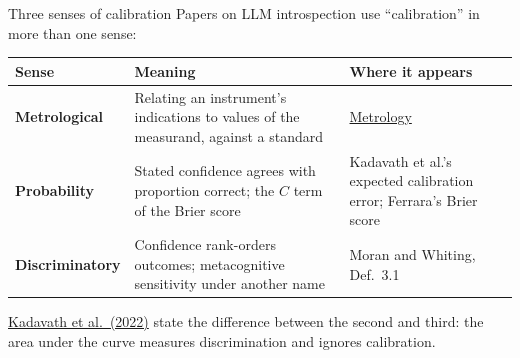 \documentclass[aspectratio=169,11pt]{beamer}
\newcommand{\site}{https://measuring-self-reports.github.io/measuring-self-reports}
\begin{document}
\begin{frame}[label=calsenses]{Three senses of calibration}
Papers on LLM introspection use ``calibration'' in more than one sense:

\vspace{0.2em}
\begin{center}
{\footnotesize\renewcommand{\arraystretch}{1.15}
\begin{tabular}{L{2.8cm}L{6.2cm}L{3.6cm}}
\toprule
\textbf{Sense} & \textbf{Meaning} & \textbf{Where it appears} \\
\midrule
\textcolor{state}{\textbf{Metrological}} & Relating an instrument's indications to values of the measurand, against a standard & \href{\site/foundations/metrology/}{Metrology} \\
\textcolor{bias}{\textbf{Probability}} & Stated confidence agrees with proportion correct; the $C$ term of the Brier score & Kadavath et al.'s expected calibration error; Ferrara's Brier score \\
\textcolor{report}{\textbf{Discriminatory}} & Confidence rank-orders outcomes; metacognitive sensitivity under another name & Moran and Whiting, Def.~3.1 \\
\bottomrule
\end{tabular}
}
\end{center}

\vspace{0.2em}
{\small \href{\site/papers/kadavath-2022/}{Kadavath et al.\ (2022)} state the difference between the second and third: the area under the curve measures discrimination and ignores calibration.}
\end{frame}
\end{document}
